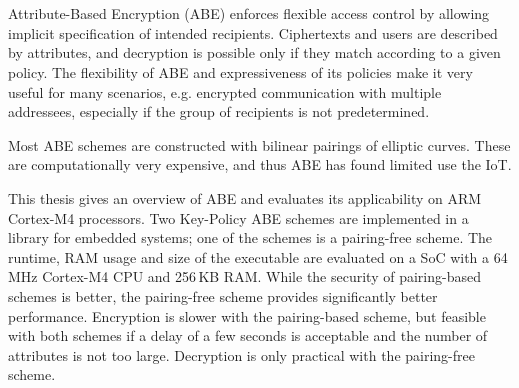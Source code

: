 \chapter{\abstractname}

Attribute-Based Encryption (ABE) enforces flexible access control by allowing implicit specification of intended recipients.
Ciphertexts and users are described by attributes, and decryption is possible only if they match according to a given policy.
The flexibility of ABE and expressiveness of its policies make it very useful for many scenarios, e.g. encrypted communication with multiple addressees, especially if the group of recipients is not predetermined.

Most ABE schemes are constructed with bilinear pairings of elliptic curves.
These are computationally very expensive, and thus ABE has found limited use the IoT.

This thesis gives an overview of ABE and evaluates its applicability on ARM Cortex-M4 processors.
Two Key-Policy ABE schemes are implemented in a library for embedded systems; one of the schemes is a pairing-free scheme.
The runtime, RAM usage and size of the executable are evaluated on a SoC with a 64\,MHz Cortex-M4 CPU and 256\,KB RAM.
While the security of pairing-based schemes is better, the pairing-free scheme provides significantly better performance.
Encryption is slower with the pairing-based scheme, but feasible with both schemes if a delay of a few seconds is acceptable and the number of attributes is not too large.
Decryption is only practical with the pairing-free scheme.